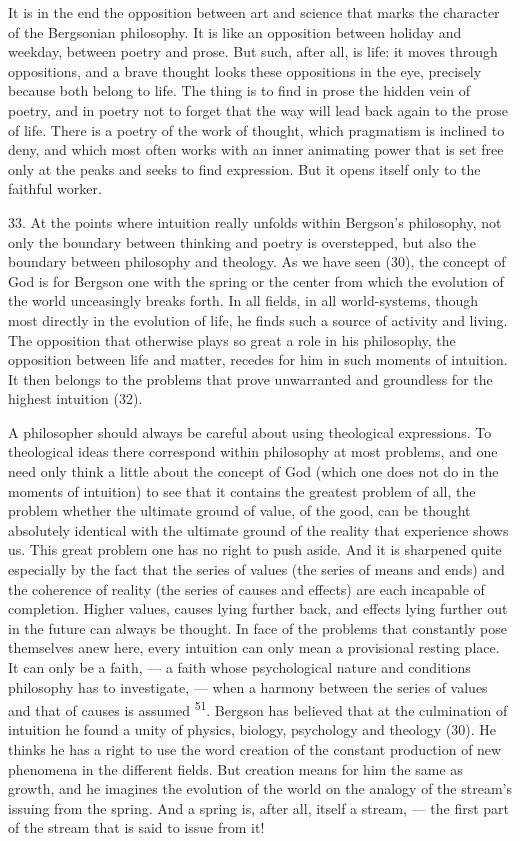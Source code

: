 \documentclass[12pt,a4paper,openany]{book}
\newcommand{\opage}[1]{\marginnote{\footnotesize\textit{[#1]}}}
\newcommand{\nm}[1]{\unskip\textsuperscript{#1}}
\begin{document}
It is in the end the opposition between art and science that marks the character of the Bergsonian philosophy. It is like an opposition between holiday and weekday, between poetry and prose. But such, after all, is life: it moves through oppositions, and a brave thought looks these oppositions in the eye, precisely because both belong to life. The thing is to find in prose the hidden vein of poetry, and in poetry not
\opage{60}to forget that the way will lead back again to the prose of life. There is a poetry of the work of thought, which pragmatism is inclined to deny, and which most often works with an inner animating power that is set free only at the peaks and seeks to find expression. But it opens itself only to the faithful worker.

33. At the points where intuition really unfolds within Bergson's philosophy, not only the boundary between thinking and poetry is overstepped, but also the boundary between philosophy and theology. As we have seen (30), the concept of God is for Bergson one with the spring or the center from which the evolution of the world unceasingly breaks forth. In all fields, in all world-systems, though most directly in the evolution of life, he finds such a source of activity and living. The opposition that otherwise plays so great a role in his philosophy, the opposition between life and matter, recedes for him in such moments of intuition. It then belongs to the problems that prove unwarranted and groundless for the highest intuition (32).

A philosopher should always be careful about using theological expressions. To theological ideas there correspond within philosophy at most problems, and one need only think a little about the concept of God (which one does not do in the moments of intuition) to see that it contains the greatest problem of all, the problem whether the ultimate ground of value, of the good, can be thought absolutely identical with the ultimate ground of the reality that experience shows us. This great problem one has no right to push aside. And it is sharpened quite especially by the fact that the series of values (the series of means and ends) and the coherence of reality (the series of causes and effects) are each incapable of completion. Higher values, causes lying further back, and effects lying further out in the future can always be thought. In face of the problems that constantly pose themselves anew here, every intuition can only mean a provisional resting place. It can only be a faith, --- a faith whose psychological nature and conditions philosophy has to investigate, --- when a harmony between the series of values and that of causes is assumed \nm{51}.
\opage{61}Bergson has believed that at the culmination of intuition he found a unity of physics, biology, psychology and theology (30). He thinks he has a right to use the word creation of the constant production of new phenomena in the different fields. But creation means for him the same as growth, and he imagines the evolution of the world on the analogy of the stream's issuing from the spring. And a spring is, after all, itself a stream, --- the first part of the stream that is said to issue from it!
\end{document}
